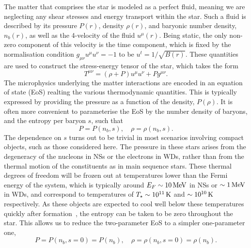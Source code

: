 The matter that comprises the star is modeled as a perfect fluid, meaning we are neglecting any shear stresses and energy transport within the star. Such a fluid is described by its pressure $P(r)$, density $\rho(r)$, and baryonic number density, $n_b(r)$, as well as the 4-velocity of the fluid $u^\mu(r)$. Being static, the only non-zero component of this velocity is the time component, which is fixed by the normalisation condition $g_{\mu\nu}u^\mu u^\nu = -1$ to be $u^t = 1/\sqrt{B(r)}$.
These quantities are used to construct the stress-energy tensor of the star, which takes the form
\begin{equation}
    T^{\mu\nu} = (\rho + P)u^\mu u^\nu + P g^{\mu\nu}.
\end{equation}
The microphysics underlying the matter interactions are encoded in an equation of state (EoS) realting the various thermodynamic quantities. This is typically expressed by providing the pressure as a function of the density, $P(\rho)$. It is often more convenient to parameterise the EoS by the number density of baryons, and the entropy per baryon $s$, such that
\begin{equation}
    P=P(n_b, s), \quad \rho = \rho(n_b, s).
\end{equation}
The dependence on $s$ turns out to be trivial in most scenarios involving compact objects, such as those considered here. The pressure in these stars arises from the degeneracy of the nucleons in NSs or the electrons in WDs, rather than from the thermal motion of the constituents as in main sequence stars. These thermal degrees of freedom will be frozen out at temperatures lower than the Fermi energy of the system, which is typically around $E_F \sim 10{\rm \,MeV}$ in NSs or $\sim 1 {\rm \,MeV}$ in WDs, and correspond to temperatures of $T_\star\sim 10^{11}{\rm \,K}$ and $\sim 10^{10}{\rm \,K}$ respectively. As these objects are expected to cool well below these temperatures quickly after formation~\cite{Yakovlev:2004iq_Neutronstarcooling,Yakovlev:2004yr_Neutronstarcooling, Bedard_oct_Spectralevolutionhot}, the entropy can be taken to be zero throughout the star. This allows us to reduce the two-parameter EoS to a simpler one-parameter one,
\begin{equation}
    P=P(n_b, s = 0) = P(n_b), \quad \rho = \rho(n_b, s=0) = \rho(n_b).\label{eq:1_param_EoS}
\end{equation} 


